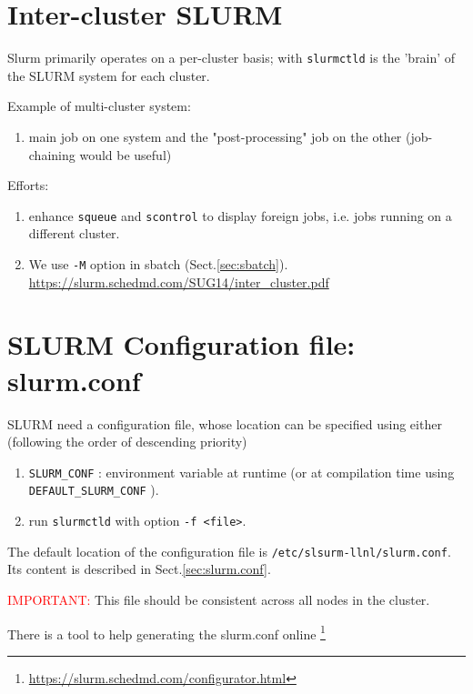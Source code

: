\section{Inter-cluster SLURM}
\label{sec:SLURM-inter-cluster}

Slurm primarily operates on a per-cluster basis; with
\verb!slurmctld! is the 'brain' of the SLURM system for each cluster.

Example of multi-cluster system:
\begin{enumerate}
  \item  main job on one system and the "post-processing" job on the other
  (job-chaining would be useful)
  
\end{enumerate}

Efforts:
\begin{enumerate}
  \item  enhance \verb!squeue! and \verb!scontrol! to display foreign
jobs, i.e. jobs running on a different cluster.


  \item We use \verb!-M! option in sbatch (Sect.\ref{sec:sbatch}).
\url{https://slurm.schedmd.com/SUG14/inter_cluster.pdf}
  
\end{enumerate}




\section{SLURM Configuration file: slurm.conf}
\label{sec:slurm_conf_file}

SLURM need a configuration file, whose location can be specified using
either (following the order of descending priority)

\begin{enumerate}
  \item \verb!SLURM_CONF! : environment variable at runtime (or at
  compilation time using \verb!DEFAULT_SLURM_CONF! ).
    
  \item run \verb!slurmctld! with option \verb!-f <file>!.
\end{enumerate}
The default location of the configuration file is
\verb!/etc/slsurm-llnl/slurm.conf!.
Its content is described in Sect.\ref{sec:slurm.conf}.

\textcolor{red}{IMPORTANT:} This file should be consistent across all nodes in 
the cluster.

There is a tool to help generating the slurm.conf online
\footnote{\url{https://slurm.schedmd.com/configurator.html}}


